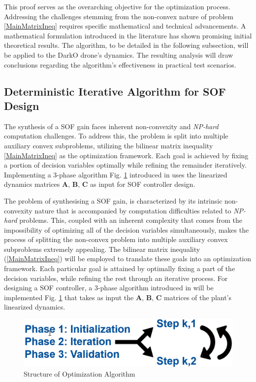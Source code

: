 This proof serves as the overarching objective for the optimization process. Addressing the challenges stemming from the non-convex nature of problem \ref{MainMatrixIneq} requires specific mathematical and technical advancements. A mathematical formulation introduced in the literature has shown promising initial theoretical results. The algorithm, to be detailed in the following subsection, will be applied to the DarkO drone's dynamics. The resulting analysis will draw conclusions regarding the algorithm's effectiveness in practical test scenarios.

\subsection{Deterministic Iterative Algorithm for SOF Design}
\label{3a}

The synthesis of a SOF gain faces inherent non-convexity and \textit{NP-hard} computation challenges. To address this, the problem is split into multiple auxiliary convex subproblems, utilizing the bilinear matrix inequality \ref{MainMatrixIneq} as the optimization framework. Each goal is achieved by fixing a portion of decision variables optimally while refining the remainder iteratively. Implementing a 3-phase algorithm Fig. \ref{AlgoPhases} introduced in \cite{Arzelier2018} uses the linearized dynamics matrices \textbf{A}, \textbf{B}, \textbf{C} as input for SOF controller design.

The problem of synthesising a SOF gain, is characterized by its intrinsic non-convexity nature that is accompanied by computation difficulties related to \textit{NP-hard} problems. This, coupled with an inherent complexity that comes from the impossibility of optimizing all of the decision variables simultaneously, makes the process of splitting the non-convex problem into multiple auxiliary convex subproblems extremely appealing. The bilinear matrix inequality (\ref{MainMatrixIneq}) will be employed to translate these goals into an optimization framework. Each particular goal is attained by optimally fixing a part of the decision variables, while refining the rest through an iterative process. For designing a SOF controller, a 3-phase algorithm introduced in \cite{Arzelier2018} will be implemented Fig. \ref{AlgoPhases} that takes as input the \textbf{A}, \textbf{B}, \textbf{C} matrices of the plant's linearized dynamics.

\vspace{-0.1cm}

\begin{figure}[hbt]
    \centering
      \includegraphics[width=0.6\columnwidth]{figures/AlgorithmPhases.png}
      \vspace{-0.2cm}\caption{ Structure of Optimization Algorithm}
      \label{AlgoPhases}
\end{figure} 

